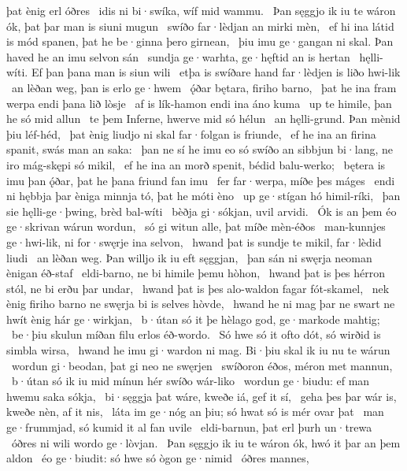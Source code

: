 þat ènig erl óðres \hld\ idis ni bi·swíka,
wíf mid wammu. \hld\ Þan sęggjo ik iu te wáron ók,
þat þar man is siuni mugun \hld\ swíðo far·lèdjan
an mirki mèn, \hld\ ef hi ina látid is mód spanen,
þat he be·ginna þero girnean, \hld\ þiu imu ge·gangan ni skal.
Þan haved he an imu selvon sán \hld\ sundja ge·warhta,
ge·hęftid an is hertan \hld\ hęlli-wíti.
Ef þan þana man is siun wili \hld\ etþa is swíðare hand
far·lèdjen is liðo hwi-lik \hld\ an lèðan weg,
þan is erlo ge·hwem \hld\ ǫ́ðar bętara,
firiho barno, \hld\ þat he ina fram werpa
endi þana lið lòsje \hld\ af is lík-hamon
endi ina áno kuma \hld\ up te himile,
þan he só mid allun \hld\ te þem Inferne,
hwerve mid só hélun \hld\ an hęlli-grund.
Þan mènid þiu léf-héd, \hld\ þat ènig liudjo ni skal
far·folgan is friunde, \hld\ ef he ina an firina spanit,
swás man an saka: \hld\ þan ne sí he imu eo só swíðo an sibbjun bi·lang,
ne iro mág-skępi só mikil, \hld\ ef he ina an morð spenit,
bédid balu-werko; \hld\ bętera is imu þan ǫ́ðar,
þat he þana friund fan imu \hld\ fer far·werpa,
míðe þes máges \hld\ endi ni hębbja þar èniga minnja tó,
þat he móti èno \hld\ up ge·stígan
hó himil-ríki, \hld\ þan sie hęlli-ge·þwing,
brèd bal-wíti \hld\ bèðja gi·sókjan,
uvil arvidi. \hld\ Ók is an þem éo ge·skrivan
wárun wordun, \hld\ só gi witun alle,
þat míðe mèn-éðos \hld\ man-kunnjes ge·hwi-lik,
ni for·swęrje ina selvon, \hld\ hwand þat is sundje te mikil,
far·lèdid liudi \hld\ an lèðan weg.
Þan willjo ik iu eft sęggjan, \hld\ þan sán ni swęrja neoman
ènigan éð-staf \hld\ eldi-barno,
ne bi himile þemu hòhon, \hld\ hwand þat is þes hérron stól,
ne bi erðu þar undar, \hld\ hwand þat is þes alo-waldon
fagar fót-skamel, \hld\ nek ènig firiho barno
ne swęrja bi is selves hòvde, \hld\ hwand he ni mag þar ne swart ne hwít
ènig hár ge·wirkjan, \hld\ b·útan só it þe hèlago god,
ge·markode mahtig; \hld\ be·þiu skulun míðan filu
erlos éð-wordo. \hld\ Só hwe só it ofto dót,
só wirðid is simbla wirsa, \hld\ hwand he imu gi·wardon ni mag.
Bi·þiu skal ik iu nu te wárun \hld\ wordun gi·beodan,
þat gi neo ne swęrjen \hld\ swíðoron éðos,
méron met mannun, \hld\ b·útan só ik iu mid mínun hér
swíðo wár-liko \hld\ wordun ge·biudu:
ef man hwemu saka sókja, \hld\ bi·sęggja þat wáre,
kweðe iá, gef it sí, \hld\ geha þes þar wár is,
kweðe nèn, af it nis, \hld\ láta im ge·nóg an þiu;
só hwat só is mér ovar þat \hld\ man ge·frummjad,
só kumid it al fan uvile \hld\ eldi-barnun,
þat erl þurh un·trewa \hld\ óðres ni wili
wordo ge·lòvjan. \hld\ Þan sęggjo ik iu te wáron ók,
hwó it þar an þem aldon \hld\ éo ge·biudit:
só hwe só ògon ge·nimid \hld\ óðres mannes,
